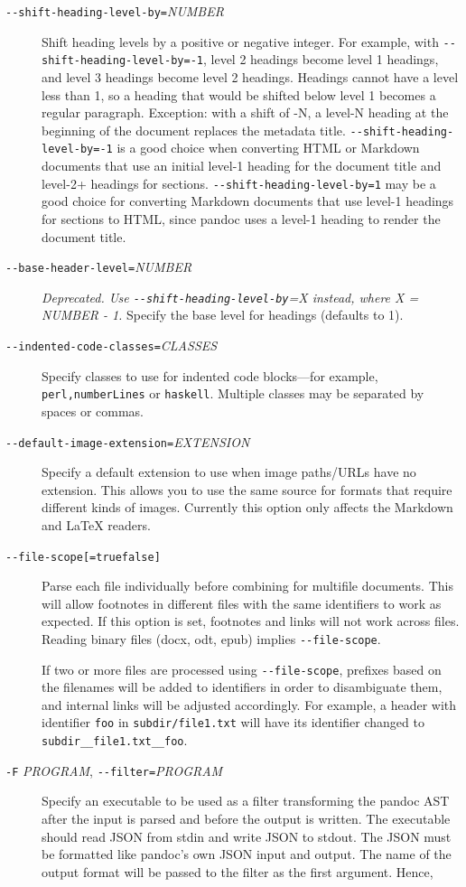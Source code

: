 \documentclass[
]{article}
\begin{document}
\begin{description}
\item[\texttt{-\/-shift-heading-level-by=}\emph{NUMBER}]
Shift heading levels by a positive or negative integer. For example,
with \texttt{-\/-shift-heading-level-by=-1}, level 2 headings become
level 1 headings, and level 3 headings become level 2 headings. Headings
cannot have a level less than 1, so a heading that would be shifted
below level 1 becomes a regular paragraph. Exception: with a shift of
-N, a level-N heading at the beginning of the document replaces the
metadata title. \texttt{-\/-shift-heading-level-by=-1} is a good choice
when converting HTML or Markdown documents that use an initial level-1
heading for the document title and level-2+ headings for sections.
\texttt{-\/-shift-heading-level-by=1} may be a good choice for
converting Markdown documents that use level-1 headings for sections to
HTML, since pandoc uses a level-1 heading to render the document title.
\item[\texttt{-\/-base-header-level=}\emph{NUMBER}]
\emph{Deprecated. Use \texttt{-\/-shift-heading-level-by}=X instead,
where X = NUMBER - 1.} Specify the base level for headings (defaults to
1).
\item[\texttt{-\/-indented-code-classes=}\emph{CLASSES}]
Specify classes to use for indented code blocks---for example,
\texttt{perl,numberLines} or \texttt{haskell}. Multiple classes may be
separated by spaces or commas.
\item[\texttt{-\/-default-image-extension=}\emph{EXTENSION}]
Specify a default extension to use when image paths/URLs have no
extension. This allows you to use the same source for formats that
require different kinds of images. Currently this option only affects
the Markdown and LaTeX readers.
\item[\texttt{-\/-file-scope{[}=true\textbar{}false{]}}]
Parse each file individually before combining for multifile documents.
This will allow footnotes in different files with the same identifiers
to work as expected. If this option is set, footnotes and links will not
work across files. Reading binary files (docx, odt, epub) implies
\texttt{-\/-file-scope}.

If two or more files are processed using \texttt{-\/-file-scope},
prefixes based on the filenames will be added to identifiers in order to
disambiguate them, and internal links will be adjusted accordingly. For
example, a header with identifier \texttt{foo} in
\texttt{subdir/file1.txt} will have its identifier changed to
\texttt{subdir\_\_file1.txt\_\_foo}.
\item[\texttt{-F} \emph{PROGRAM}, \texttt{-\/-filter=}\emph{PROGRAM}]
Specify an executable to be used as a filter transforming the pandoc AST
after the input is parsed and before the output is written. The
executable should read JSON from stdin and write JSON to stdout. The
JSON must be formatted like pandoc's own JSON input and output. The name
of the output format will be passed to the filter as the first argument.
Hence,


\end{description}
\end{document}
